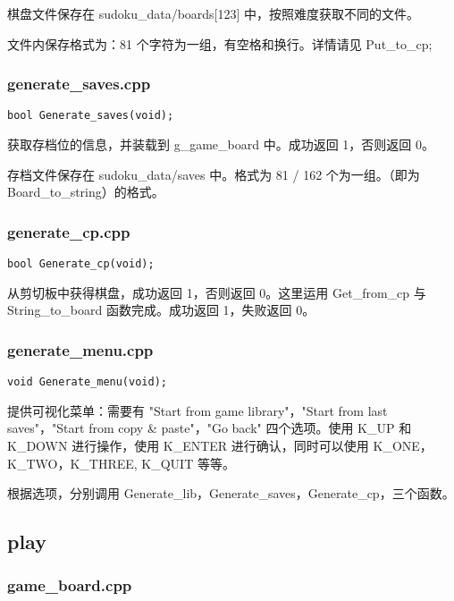 \documentclass{article}
\begin{document}
    棋盘文件保存在 sudoku\_data/boards[123] 中，按照难度获取不同的文件。

    文件内保存格式为：81 个字符为一组，有空格和换行。详情请见 Put\_to\_cp;

    \subsubsection{generate\_saves.cpp}

    \begin{lstlisting}
bool Generate_saves(void);
    \end{lstlisting}

    获取存档位的信息，并装载到 g\_game\_board 中。成功返回 1，否则返回 0。

    存档文件保存在 sudoku\_data/saves 中。格式为 81 / 162 个为一组。（即为 Board\_to\_string）的格式。

    \subsubsection{generate\_cp.cpp}

    \begin{lstlisting}
bool Generate_cp(void);
    \end{lstlisting}

    从剪切板中获得棋盘，成功返回 1，否则返回 0。这里运用 Get\_from\_cp 与 String\_to\_board 函数完成。成功返回 1，失败返回 0。
    
    \subsubsection{generate\_menu.cpp}

    \begin{lstlisting}
void Generate_menu(void);
    \end{lstlisting}

    提供可视化菜单：需要有 "Start from game library"，"Start from last saves"，"Start from copy \& paste"，"Go back" 四个选项。使用 K\_UP 和 K\_DOWN 进行操作，使用 K\_ENTER 进行确认，同时可以使用 K\_ONE， K\_TWO，K\_THREE, K\_QUIT 等等。

    根据选项，分别调用 Generate\_lib，Generate\_saves，Generate\_cp，三个函数。

    \subsection{play}

    \subsubsection{game\_board.cpp}
\end{document}
